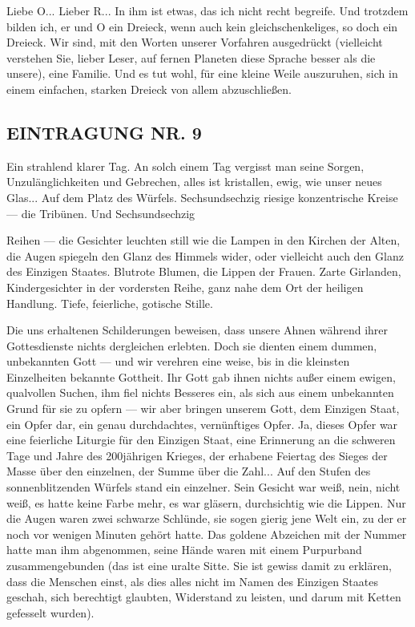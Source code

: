 Liebe O... Lieber R... In ihm ist etwas, das ich nicht recht
begreife. Und trotzdem bilden ich, er und O ein Dreieck, wenn auch
kein gleichschenkeliges, so doch ein Dreieck. Wir sind, mit den
Worten unserer Vorfahren ausgedrückt (vielleicht verstehen Sie,
lieber Leser, auf fernen Planeten diese Sprache besser als die
unsere), eine Familie. Und es tut wohl, für eine kleine Weile
auszuruhen, sich in einem einfachen, starken Dreieck von allem
abzuschließen.

\subsection{EINTRAGUNG NR. 9}

Ein strahlend klarer Tag. An solch einem Tag vergisst man seine
Sorgen, Unzulänglichkeiten und Gebrechen, alles ist kristallen,
ewig, wie unser neues Glas... Auf dem Platz des Würfels.
Sechsundsechzig riesige konzentrische Kreise — die Tribünen. Und
Sechsundsechzig

Reihen — die Gesichter leuchten still wie die Lampen in den Kirchen
der Alten, die Augen spiegeln den Glanz des Himmels wider, oder
vielleicht auch den Glanz des Einzigen Staates. Blutrote Blumen,
die Lippen der Frauen. Zarte Girlanden, Kindergesichter in der
vordersten Reihe, ganz nahe dem Ort der heiligen Handlung. Tiefe,
feierliche, gotische Stille.

Die uns erhaltenen Schilderungen beweisen, dass unsere Ahnen
während ihrer Gottesdienste nichts dergleichen erlebten. Doch sie
dienten einem dummen, unbekannten Gott — und wir verehren eine
weise, bis in die kleinsten Einzelheiten bekannte Gottheit. Ihr
Gott gab ihnen nichts außer einem ewigen, qualvollen Suchen, ihm
fiel nichts Besseres ein, als sich aus einem unbekannten Grund für
sie zu opfern — wir aber bringen unserem Gott, dem Einzigen Staat,
ein Opfer dar, ein genau durchdachtes, vernünftiges Opfer. Ja,
dieses Opfer war eine feierliche Liturgie für den Einzigen Staat,
eine Erinnerung an die schweren Tage und Jahre des 200jährigen
Krieges, der erhabene Feiertag des Sieges der Masse über den
einzelnen, der Summe über die Zahl... Auf den Stufen des
sonnenblitzenden Würfels stand ein einzelner. Sein Gesicht war
weiß, nein, nicht weiß, es hatte keine Farbe mehr, es war gläsern,
durchsichtig wie die Lippen. Nur die Augen waren zwei schwarze
Schlünde, sie sogen gierig jene Welt ein, zu der er noch vor
wenigen Minuten gehört hatte. Das goldene Abzeichen mit der Nummer
hatte man ihm abgenommen, seine Hände waren mit einem Purpurband
zusammengebunden (das ist eine uralte Sitte. Sie ist gewiss damit
zu erklären, dass die Menschen einst, als dies alles nicht im Namen
des Einzigen Staates geschah, sich berechtigt glaubten, Widerstand
zu leisten, und darum mit Ketten gefesselt wurden).

